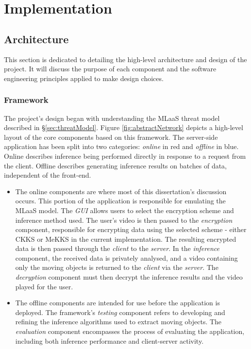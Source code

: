 \chapter{Implementation}
\label{chap:implementation}


\section{Architecture}
\setlength{\leftskip}{0.25cm}
\indent \indent
This section is dedicated to detailing the high-level architecture and design of the project. It will discuss the purpose of each component and the software engineering principles applied to make design choices.

\setlength{\leftskip}{0cm}
\subsection{Framework}
\setlength{\leftskip}{0.5cm}
\indent \indent
The project's design began with understanding the MLaaS threat model described in §\ref{sec:threatModel}. Figure \ref{fig:abstractNetwork} depicts a high-level layout of the core components based on this framework. The server-side application has been split into two categories: \textit{online} in red and \textit{offline} in blue. Online describes inference being performed directly in response to a request from the client. Offline describes generating inference results on batches of data, independent of the front-end. 
\begin{itemize}
    \item The online components are where most of this dissertation's discussion occurs. This portion of the application is responsible for emulating the MLaaS model. The \textit{GUI} allows users to select the encryption scheme and inference method used. The user's video is then passed to the \textit{encryption} component, responsible for encrypting data using the selected scheme - either CKKS or MeKKS in the current implementation. The resulting encrypted data is then passed through the \textit{client} to the \textit{server}. In the \textit{inference} component, the received data is privately analysed, and a video containing only the moving objects is returned to the \textit{client} via the \textit{server}. The \textit{decryption} component must then decrypt the inference results and the video played for the user.
    \item The offline components are intended for use before the application is deployed. The framework's \textit{testing} component refers to developing and refining the inference algorithms used to extract moving objects. The \textit{evaluation} component encompasses the process of evaluating the application, including both inference performance and client-server activity.
\end{itemize}

